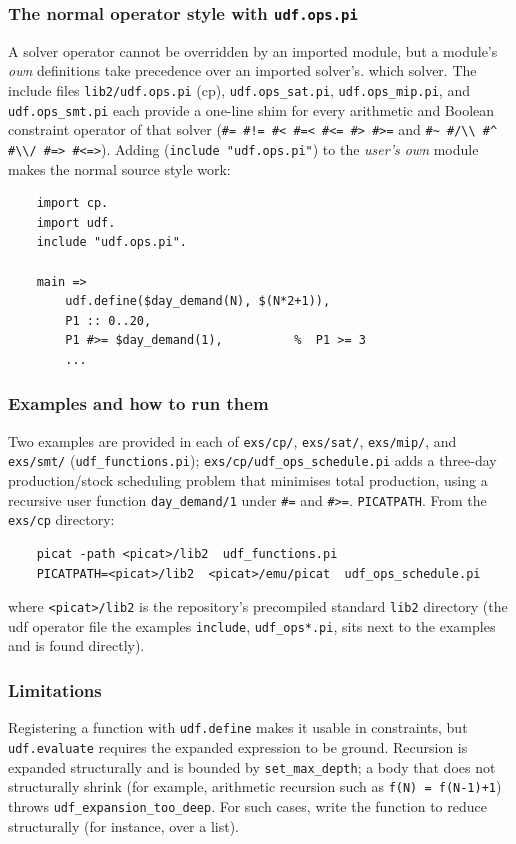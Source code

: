 \subsubsection{The normal operator style with \texttt{udf.ops.pi}}

A solver operator cannot be overridden by an imported module, but a
module's \emph{own} definitions take precedence over an imported solver's.
which solver.  The include files
\texttt{lib2/udf.ops.pi} (cp), \texttt{udf.ops\_sat.pi},
\texttt{udf.ops\_mip.pi}, and \texttt{udf.ops\_smt.pi}
each provide a one-line shim for every arithmetic and Boolean constraint
operator of that solver
(\verb+#= #!= #< #=< #<= #> #>=+ and
\verb+#~ #/\\ #^ #\\/ #=> #<=>+).  Adding
(\texttt{include "udf.ops.pi"}) to the \emph{user's own} module makes
the normal source style work:

\begin{verbatim}
    import cp.
    import udf.
    include "udf.ops.pi".

    main =>
        udf.define($day_demand(N), $(N*2+1)),
        P1 :: 0..20,
        P1 #>= $day_demand(1),          %  P1 >= 3
        ...
\end{verbatim}

\subsubsection{Examples and how to run them}

Two examples are provided in each of \texttt{exs/cp/},
\texttt{exs/sat/}, \texttt{exs/mip/}, and \texttt{exs/smt/}
(\texttt{udf\_functions.pi}); \texttt{exs/cp/udf\_ops\_schedule.pi}
adds a three-day production/stock scheduling problem that minimises
total production, using a recursive user function
\texttt{day\_demand/1} under \texttt{\#=} and \texttt{\#>=}.
\texttt{PICATPATH}.  From the \texttt{exs/cp} directory:

\begin{verbatim}
    picat -path <picat>/lib2  udf_functions.pi
    PICATPATH=<picat>/lib2  <picat>/emu/picat  udf_ops_schedule.pi
\end{verbatim}

where \texttt{<picat>/lib2} is the repository's precompiled standard
\texttt{lib2} directory (the udf operator file the examples
\texttt{include}, \texttt{udf\_ops*.pi}, sits next to the examples and is
found directly).

\subsubsection{Limitations}

Registering a function with \texttt{udf.define} makes it usable in
constraints, but \texttt{udf.evaluate} requires the expanded expression to
be ground.  Recursion is expanded structurally and is bounded by
\texttt{set\_max\_depth}; a body that does not structurally shrink (for
example, arithmetic recursion such as \texttt{f(N) = f(N-1)+1}) throws
\texttt{udf\_expansion\_too\_deep}.  For such cases, write the function to
reduce structurally (for instance, over a list).
